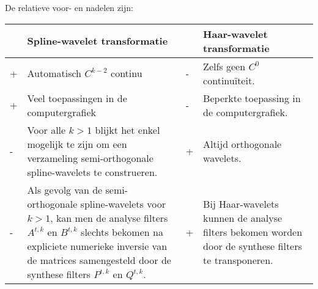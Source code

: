 \begin{enumerate}
{\begin{itemize}
			De relatieve voor- en nadelen zijn:
			\begin{table}[ht]
				\centering
				\begin{tabular}{| l | p{0.3\textwidth} | l | p{}|}
					 \hline
					 & Spline-wavelet transformatie & & Haar-wavelet transformatie \\
					 \hline
					 + & Automatisch $C^{k - 2}$ continu & - & Zelfs geen $C^0$ continuïteit. \\
					 \hline
					 + & Veel toepassingen in de computergrafiek & - & Beperkte toepassing in de computergrafiek.\\
					 \hline
					 - & Voor alle $k > 1$ blijkt het enkel mogelijk te zijn om een verzameling semi-orthogonale spline-wavelets te construeren. & + & Altijd orthogonale wavelets. \\
					 \hline
					 - & Als gevolg van de semi-orthogonale spline-wavelets voor $k > 1$, kan men de analyse filters $A^{t,k}$ en $B^{t,k}$ slechts bekomen na expliciete numerieke inversie van de matrices samengesteld door de synthese filters $P^{t, k}$ en $Q^{t, k}$. & + & Bij Haar-wavelets kunnen de analyse filters bekomen worden door de synthese filters te transponeren. \\
					\hline
				\end{tabular}
			\end{table}
		\end{itemize}
	}


\end{enumerate}
